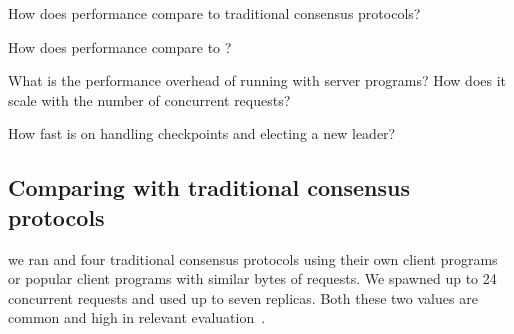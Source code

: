 \begin{tightenum}

\item[\S\ref{sec:eval-traditional}:] How does \xxx performance compare
to traditional consensus protocols?

\item[\S\ref{sec:eval-dare}:] How does \xxx performance compare
to \dare?

\item[\S\ref{sec:overhead}:] What is the performance overhead of running \xxx
with server programs? How does it scale with the number of concurrent 
requests?


\item[\S\ref{sec:robust}:] How fast is \xxx on handling checkpoints and
electing a new leader?



\end{tightenum}





\subsection{Comparing with traditional consensus protocols}
\label{sec:eval-traditional}

we ran \xxx and four traditional consensus protocols using their own 
client programs or popular client programs with similar bytes of requests.
We spawned up to 24 concurrent requests and used up to seven 
replicas. Both these two values are common and high in relevant 
evaluation~\cite{zookeeper,crane:sosp15,rex:eurosys14,dare:hpdc15}.


